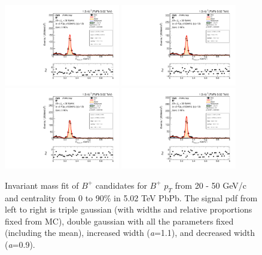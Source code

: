 \begin{figure}[hbtp]
\begin{center}
\includegraphics[width=0.45\textwidth]{Figures/Chapter4/data_PbPb_1_Bpt_2050_3gauss_doubly0_ntKp.pdf}
\includegraphics[width=0.45\textwidth]{Figures/Chapter4/data_PbPb_1_Bpt_2050_fixed_doubly0_ntKp.pdf}
\includegraphics[width=0.45\textwidth]{Figures/Chapter4/data_PbPb_1_Bpt_2050_scal+_doubly0_ntKp.pdf}
\includegraphics[width=0.45\textwidth]{Figures/Chapter4/data_PbPb_1_Bpt_2050_scal-_doubly0_ntKp.pdf}
\caption{Invariant mass fit of $B^+$ candidates for $B^+$ $p_T$ from 20 - 50 GeV/c and centrality from 0 to 90\% in 5.02 TeV PbPb. The signal pdf from left to right is triple gaussian (with widths and relative proportions fixed from MC), double gaussian with all the parameters fixed (including the mean), increased width (\textit{a}=1.1), and decreased width (\textit{a}=0.9).}
\label{BPSigVar}
\end{center}
\end{figure}

